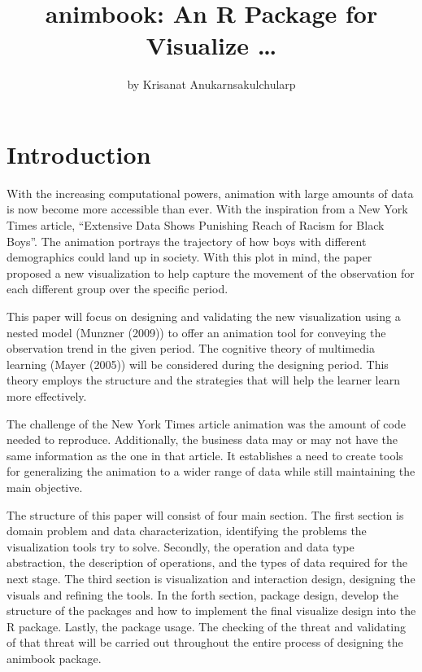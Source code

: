 \title{animbook: An R Package for Visualize \ldots{}}
\author{by Krisanat Anukarnsakulchularp}

\maketitle


\hypertarget{introduction}{%
\section{Introduction}\label{introduction}}

With the increasing computational powers, animation with large amounts of data is now become more accessible than ever. With the inspiration from a New York Times article, ``Extensive Data Shows Punishing Reach of Racism for Black Boys''. The animation portrays the trajectory of how boys with different demographics could land up in society. With this plot in mind, the paper proposed a new visualization to help capture the movement of the observation for each different group over the specific period.

This paper will focus on designing and validating the new visualization using a nested model (Munzner (2009)) to offer an animation tool for conveying the observation trend in the given period. The cognitive theory of multimedia learning (Mayer (2005)) will be considered during the designing period. This theory employs the structure and the strategies that will help the learner learn more effectively.

The challenge of the New York Times article animation was the amount of code needed to reproduce. Additionally, the business data may or may not have the same information as the one in that article. It establishes a need to create tools for generalizing the animation to a wider range of data while still maintaining the main objective.

The structure of this paper will consist of four main section. The first section is domain problem and data characterization, identifying the problems the visualization tools try to solve. Secondly, the operation and data type abstraction, the description of operations, and the types of data required for the next stage. The third section is visualization and interaction design, designing the visuals and refining the tools. In the forth section, package design, develop the structure of the packages and how to implement the final visualize design into the R package. Lastly, the package usage. The checking of the threat and validating of that threat will be carried out throughout the entire process of designing the animbook package.


